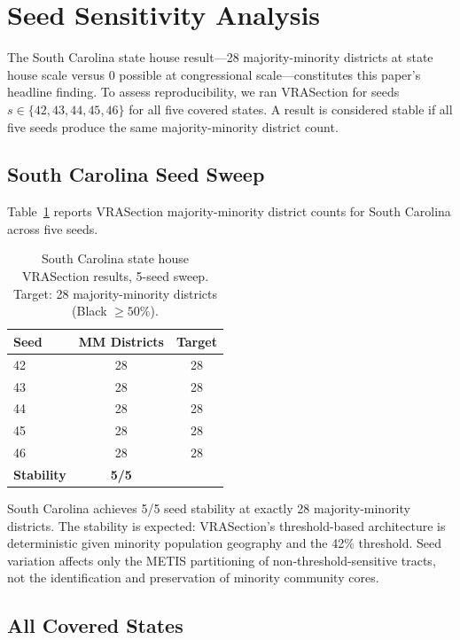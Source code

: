 \section{Seed Sensitivity Analysis}
\label{sec:seed-sensitivity}

The South Carolina state house result---28 majority-minority districts at state house scale versus 0 possible at congressional scale---constitutes this paper's headline finding. To assess reproducibility, we ran VRASection for seeds $s \in \{42, 43, 44, 45, 46\}$ for all five covered states. A result is considered stable if all five seeds produce the same majority-minority district count.

\subsection{South Carolina Seed Sweep}

Table~\ref{tab:sc-seeds} reports VRASection majority-minority district counts for South Carolina across five seeds.

\begin{table}[h]
\centering
\caption{South Carolina state house VRASection results, 5-seed sweep. Target: 28 majority-minority districts (Black $\geq 50\%$).}
\label{tab:sc-seeds}
\begin{tabular}{lcc}
\toprule
Seed & MM Districts & Target \\
\midrule
42 & 28 & 28 \\
43 & 28 & 28 \\
44 & 28 & 28 \\
45 & 28 & 28 \\
46 & 28 & 28 \\
\midrule
\textbf{Stability} & \textbf{5/5} & \\
\bottomrule
\end{tabular}
\end{table}

South Carolina achieves 5/5 seed stability at exactly 28 majority-minority districts. The stability is expected: VRASection's threshold-based architecture is deterministic given minority population geography and the 42\% threshold. Seed variation affects only the METIS partitioning of non-threshold-sensitive tracts, not the identification and preservation of minority community cores.

\subsection{All Covered States}

